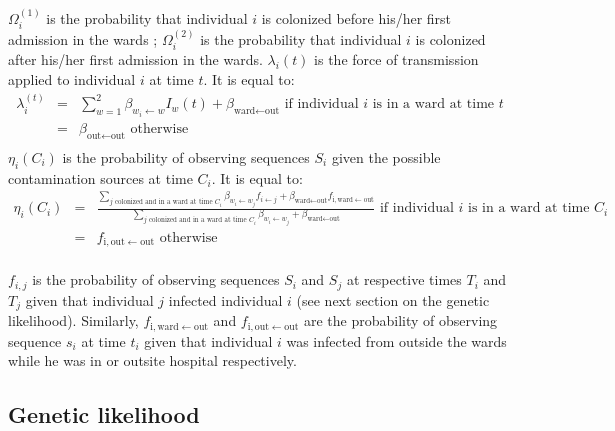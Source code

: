 \documentclass[10pt]{article}
\begin{document}
$\Omega_i^{\left(1\right)}$ is the probability that individual $i$ is colonized before his/her first admission in the wards ; $\Omega_i^{\left(2\right)}$ is the probability that individual $i$ is colonized after his/her first admission in the wards. 
$\lambda_i\left(t\right)$ is the force of transmission applied to individual $i$ at time $t$. It is equal to: 
\begin{eqnarray*}
\lambda_i^{\left(t\right)} & = & \sum_{w=1}^{2} \beta_{w_i \leftarrow w} I_w\left(t\right) + \beta_{\text{ward} \leftarrow \text{out}} \text{ if individual $i$ is in a ward at time $t$}  \\
 & = & \beta_{\text{out} \leftarrow \text{out}} \text{ otherwise}\\
\end{eqnarray*}
\bigskip
$\eta_i\left(C_i\right)$ is the probability of observing sequences $S_i$ given the possible contamination sources at time $C_i$. It is equal to: 
\begin{eqnarray*}
\eta_i\left(C_i\right) & = & \frac{\sum_{\text{$j$ colonized and in a ward at time $C_i$}} \beta_{w_i \leftarrow w_j} f_{i \leftarrow j} + \beta_{\text{ward} \leftarrow \text{out}}f_{\text{i},\text{ward} \leftarrow \text{out}} }{\sum_{\text{$j$ colonized and in a ward at time $C_i$}} \beta_{w_i \leftarrow w_j} + \beta_{\text{ward} \leftarrow \text{out}} } \text{ if individual $i$ is in a ward at time $C_i$}  \\
 & = & f_{\text{i},\text{out} \leftarrow \text{out}} \text{ otherwise}\\
\end{eqnarray*}
\bigskip

$f_{i,j}$ is the probability of observing sequences $S_i$ and $S_j$ at respective times $T_i$ and $T_j$ given that individual $j$ infected individual $i$ (see next section on the genetic likelihood). Similarly, $f_{\text{i},\text{ward} \leftarrow \text{out}}$ and $f_{\text{i},\text{out} \leftarrow \text{out}}$ are the probability of observing sequence $s_i$ at time $t_i$ given that individual $i$ was infected from outside the wards while he was in or outsite hospital respectively. 


\subsection*{Genetic likelihood}

\end{document}
